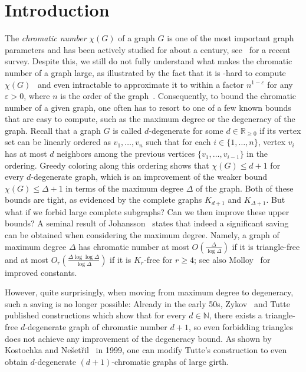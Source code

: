 \documentclass[10pt]{amsart}
\theoremstyle{definition}
\begin{document}
\maketitle

\section{Introduction
}\label{sec:intro}
The \emph{chromatic number} $\chi(G)$ of a graph $G$ is one of the most important graph parameters and has been actively studied for about a century, see~\cite{scott22} for a recent survey. Despite this, we still do not fully understand what makes the chromatic number of a graph large, as illustrated by the fact that it is \NP-hard to compute $\chi(G)$~\cite{karp} and even intractable to approximate it to within a factor $n^{1-\varepsilon}$ for any $\varepsilon>0$, where $n$ is the order of the graph~\cite{Feige}. Consequently, to bound the chromatic number of a given graph,  one often has to resort to one of a few known bounds that are easy to compute, such as the maximum degree or the degeneracy of the graph. Recall that a graph $G$ is called $d$-degenerate for some $d\in \mathbb{R}_{\ge 0}$ if its vertex set can be linearly ordered as $v_1,\ldots,v_n$ such that for each $i\in \{1,\ldots,n\}$, vertex $v_i$ has at most $d$ neighbors among the previous vertices $\{v_1,\ldots,v_{i-1}\}$ in the ordering. Greedy coloring along this ordering shows that $\chi(G)\le d+1$ for every $d$-degenerate graph, which is an improvement of the weaker bound $\chi(G)\le \Delta+1$ in terms of the maximum degree $\Delta$ of the graph. Both of these bounds are tight, as evidenced by the complete graphs $K_{d+1}$ and $K_{\Delta+1}$. But what if we forbid large complete subgraphs? Can we then improve these upper bounds? A seminal result of Johansson~\cite{johansson,johansson2} states that indeed a significant saving can be obtained when considering the maximum degree. Namely, a graph of maximum degree $\Delta$ has chromatic number at most $O\left(\frac{\Delta}{\log \Delta}\right)$ if it is triangle-free and at most $O_r\left(\frac{\Delta\log\log\Delta}{\log \Delta}\right)$ if it is $K_r$-free for $r\ge 4$; see also Molloy~\cite{molloy} for improved constants.

However, quite surprisingly, when moving from maximum degree to degeneracy, such a saving is no longer possible: Already in the early 50s, Zykov~\cite{zykov} and Tutte~\cite{descartes} published constructions which show that for every $d\in \mathbb{N}$, there exists a triangle-free $d$-degenerate graph of chromatic number $d+1$, so even forbidding triangles does not achieve any improvement of the degeneracy bound. As shown by Kostochka and Ne\v{s}et\v{r}il~\cite{kostnest} in 1999, one can modify Tutte's construction to even obtain $d$-degenerate $(d+1)$-chromatic graphs of large girth. 
\end{document}
